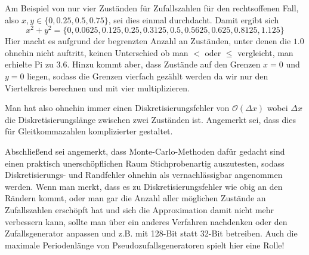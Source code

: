 Am Beispiel von nur vier Zuständen für Zufallszahlen für den rechtsoffenen Fall, also $x,y\in \lbrace 0,0.25,0.5,0.75 \rbrace$, sei dies einmal durchdacht. Damit ergibt sich
\begin{equation}
	x^2+y^2 = \lbrace 0, 0.0625, 0.125, 0.25, 0.3125, 0.5, 0.5625, 0.625, 0.8125, 1.125 \rbrace
\end{equation}
Hier macht es aufgrund der begrenzten Anzahl an Zuständen, unter denen die $1.0$ ohnehin nicht auftritt, keinen Unterschied ob man $<$ oder $\leq$ vergleicht, man erhielte Pi zu $3.6$.
Hinzu kommt aber, dass Zustände auf den Grenzen $x=0$ und $y=0$ liegen, sodass die Grenzen vierfach gezählt werden da wir nur den Viertelkreis berechnen und mit vier multiplizieren.

Man hat also ohnehin immer einen Diskretisierungsfehler von $\mathcal{O}\left(\Delta x\right)$ wobei $\Delta x$ die Diskretisierungslänge zwischen zwei Zuständen ist. Angemerkt sei, dass dies für Gleitkommazahlen komplizierter gestaltet.

Abschließend sei angemerkt, dass Monte-Carlo-Methoden dafür gedacht sind einen praktisch unerschöpflichen Raum Stichprobenartig auszutesten, sodass Diskretisierungs- und Randfehler ohnehin als vernachlässigbar angenommen werden. Wenn man merkt, dass es zu Diskretisierungsfehler wie obig an den Rändern kommt, oder man gar die Anzahl aller möglichen Zustände an Zufallszahlen erschöpft hat und sich die Approximation damit nicht mehr verbessern kann, sollte man über ein anderes Verfahren nachdenken oder den Zufallsgenerator anpassen und z.B. mit 128-Bit statt 32-Bit betreiben. Auch die maximale Periodenlänge von Pseudozufallsgeneratoren spielt hier eine Rolle!
%

